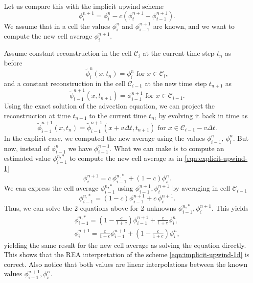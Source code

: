\documentclass[../thesis.tex]{subfiles}
\begin{document}
Let us compare this with the implicit upwind scheme
\begin{equation}\label{eqn:rea-implicit-upwind-1d}
    \phi_{i}^{n+1} =
    \phi_{i}^{n} - c\left( \phi_{i}^{n+1} - \phi_{i-1}^{n+1} \right).
\end{equation}
We assume that in a cell the
values \(\phi_{i}^{n}\) and \(\phi_{i-1}^{n+1}\) are known, and we want to compute
the new cell average \(\phi_{i}^{n+1}\).

Assume constant reconstruction in the cell \(\mathcal{C}_i\) at the current time step \(t_n\)
as before
\[
    \tilde{\phi}_{i}^{n}(x,t_n) = \phi_{i}^{n} \text{ for } x \in \mathcal{C}_i,
\]
and a constant reconstruction in the cell \(\mathcal{C}_{i-1}\) at the new time step \(t_{n+1}\)
as
\[
    \tilde{\phi}_{i-1}^{n+1}(x,t_{n+1}) = \phi_{i-1}^{n+1}
    \text{ for } x \in \mathcal{C}_{i-1}.
\]
Using the exact solution of the advection equation, we can project the reconstruction
at time \(t_{n+1}\) to the current time \(t_{n}\), by evolving it back in time as
\[
    \tilde{\phi}_{i-1}^{n+1}(x,t_{n})
    = \tilde{\phi}_{i-1}^{n+1}(x + v\Delta t,t_{n+1})
    \text{ for } x \in \mathcal{C}_{i-1} - v\Delta t.
\]
In the explicit case, we computed the new average using the values \(\phi_{i-1}^{n}\),
\(\phi_{i}^{n}\). But now, instead of \(\phi_{i-1}^{n}\) we have \(\phi_{i-1}^{n+1}\).
What we can make is to compute an estimated value \(\phi_{i-1}^{n,*}\) to compute
the new cell average as in \eqref{eqn:explicit-upwind-1}
\begin{equation}
    \phi_{i}^{n+1}
    = c~\phi_{i-1}^{n,*}
    + \left( 1 - c \right)\phi_{i}^{n}.
\end{equation}
We can express the cell average \(\phi_{i-1}^{n,*}\) using \(\phi_{i-1}^{n+1}, \phi_{i}^{n+1}\) by averaging in cell \(\mathcal{C}_{i-1}\)
\begin{equation}
    \phi_{i-1}^{n,*}
    = \left( 1-c \right)\phi_{i-1}^{n+1}
    + c~\phi_{i}^{n+1}.
\end{equation}
Thus, we can solve the 2 equations above for 2 unknowns \(\phi_{i-1}^{n,*}, \phi_{i}^{n+1}\). This yields
\begin{equation*}
    \begin{split}
        \phi_{i-1}^{n,*}
        = \left( 1 - \frac{c}{1+c} \right)\phi_{i-1}^{n+1}
        + \frac{c}{1+c}\phi_{i}^{n},
        \\
        \phi_{i}^{n+1}
        = \frac{c}{1+c}\phi_{i-1}^{n+1}
        + \left( 1 - \frac{c}{1+c} \right)\phi_{i}^{n},
    \end{split}
\end{equation*}
yielding the same result for the new cell average as solving the equation directly.
This shows that the REA interpretation of the scheme \eqref{eqn:implicit-upwind-1d} is correct.
Also notice that both values are linear interpolations between the known values
\(\phi_{i-1}^{n+1}, \phi_{i}^{n}\).
\end{document}
